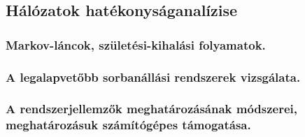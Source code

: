 \subsection{Hálózatok hatékonyságanalízise}
\subsubsection{Markov-láncok, születési-kihalási folyamatok.}

\subsubsection{A legalapvetőbb sorbanállási rendszerek vizsgálata.}

\subsubsection{A rendszerjellemzők meghatározásának módszerei, meghatározásuk számítógépes támogatása.}
